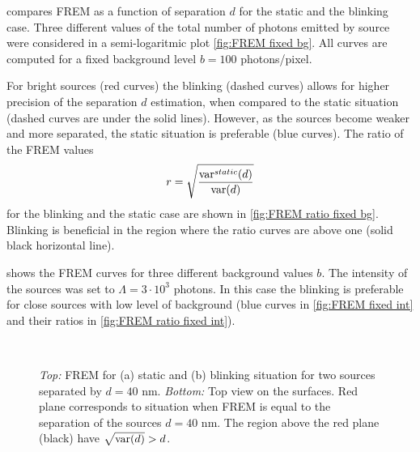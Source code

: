  compares FREM as a function of separation $d$ for the static and the blinking case. Three different values of the total number of photons emitted by source were considered in a semi-logaritmic plot \autoref{fig:FREM fixed bg}. All curves are computed for a fixed background level $b=100$ photons/pixel. 

For bright sources (red curves) the blinking (dashed curves) allows for higher precision of the separation $d$ estimation, when compared to the static situation (dashed curves are under the solid lines). However, as the sources become weaker and more separated, the static situation is preferable (blue curves). The ratio of the FREM values
%
\begin{equation}
	r=\sqrt{\frac{\mathrm{var}^{static}(d)}{\mathrm{var}(d)}}
	\label{eq:ratio}
\end{equation} 
%
for the blinking and the static case are shown in \autoref{fig:FREM ratio fixed bg}. Blinking is beneficial in the region where the ratio curves are above one (solid black horizontal line).

 shows the FREM curves for three different background values $b$. The intensity of the sources was set to $\Lambda =3\cdot 10^3$ photons. In this case the blinking is preferable for close sources with low level of background (blue curves in \autoref{fig:FREM fixed int} and their ratios in  \autoref{fig:FREM ratio fixed int}). 

\begin{figure}[!hbt]
	\centering
	\newcommand{\wf}{.48\textwidth}
	\\

	\caption{{\it Top:} FREM for (a) static and (b) blinking situation for two sources separated by $d=40$ nm. {\it Bottom:} Top view on the surfaces. Red plane corresponds to situation when FREM is equal to the separation of the sources $d=40$ nm. The region above the red plane (black) have $\sqrt{\mathrm{var}(d)}>d$.}
	\label{fig:FREM int bg}
\end{figure}


